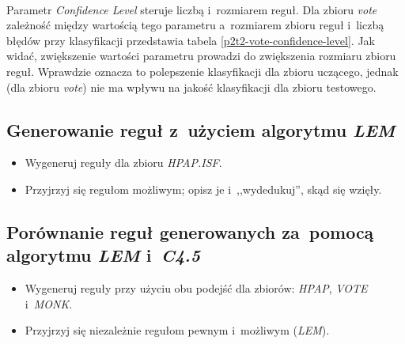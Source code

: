 \begin{itemize}
	
	\\Parametr \emph{Confidence Level} steruje liczbą i~rozmiarem reguł. Dla zbioru \emph{vote} zależność między wartością tego parametru a~rozmiarem zbioru reguł i~liczbą błędów przy klasyfikacji przedstawia tabela \ref{p2t2-vote-confidence-level}. Jak widać, zwiększenie wartości parametru prowadzi do zwiększenia rozmiaru zbioru reguł. Wprawdzie oznacza to polepszenie klasyfikacji dla zbioru uczącego, jednak (dla zbioru \emph{vote}) nie ma wpływu na jakość klasyfikacji dla zbioru testowego.

\end{itemize}


	\subsection{Generowanie reguł z~użyciem algorytmu \emph{LEM}}

\begin{itemize}
\item Wygeneruj reguły dla zbioru \emph{HPAP.ISF}.
\item Przyjrzyj się regułom możliwym; opisz je i~,,wydedukuj'', skąd się wzięły.
\end{itemize}

\subsection{Porównanie reguł generowanych za~pomocą algorytmu \emph{LEM} i~\emph{C4.5}}

\begin{itemize}
\item Wygeneruj reguły przy użyciu obu podejść dla zbiorów: \emph{HPAP}, \emph{VOTE} i~\emph{MONK}.
\item Przyjrzyj się niezależnie regułom pewnym i~możliwym (\emph{LEM}).
\end{itemize}

